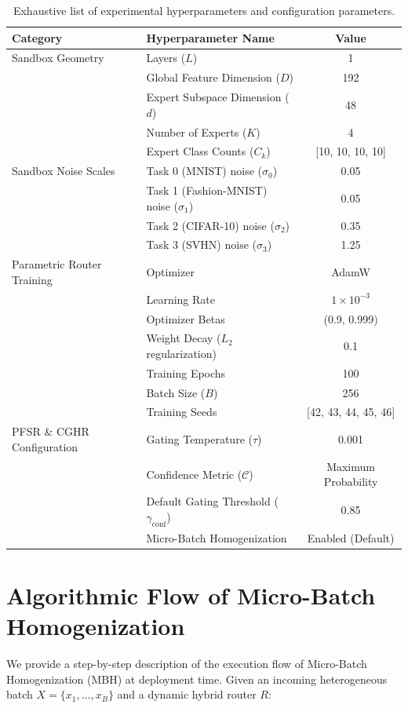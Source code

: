 \documentclass{article}
\theoremstyle{plain}
\theoremstyle{definition}
\theoremstyle{remark}
\begin{document}
\begin{table}[htbp]
\centering
\caption{Exhaustive list of experimental hyperparameters and configuration parameters.}
\label{tab:hyperparams}
\vskip 0.15in
\begin{tabular}{llc}
\toprule
Category & Hyperparameter Name & Value \\
\midrule
Sandbox Geometry & Layers ($L$) & 1 \\
& Global Feature Dimension ($D$) & 192 \\
& Expert Subspace Dimension ($d$) & 48 \\
& Number of Experts ($K$) & 4 \\
& Expert Class Counts ($C_k$) & [10, 10, 10, 10] \\
\midrule
Sandbox Noise Scales & Task 0 (MNIST) noise ($\sigma_0$) & 0.05 \\
& Task 1 (Fashion-MNIST) noise ($\sigma_1$) & 0.05 \\
& Task 2 (CIFAR-10) noise ($\sigma_2$) & 0.35 \\
& Task 3 (SVHN) noise ($\sigma_3$) & 1.25 \\
\midrule
Parametric Router Training & Optimizer & AdamW \\
& Learning Rate & $1 \times 10^{-3}$ \\
& Optimizer Betas & (0.9, 0.999) \\
& Weight Decay ($L_2$ regularization) & 0.1 \\
& Training Epochs & 100 \\
& Batch Size ($B$) & 256 \\
& Training Seeds & [42, 43, 44, 45, 46] \\
\midrule
PFSR \& CGHR Configuration & Gating Temperature ($\tau$) & 0.001 \\
& Confidence Metric ($\mathcal{C}$) & Maximum Probability \\
& Default Gating Threshold ($\gamma_{\text{conf}}$) & 0.85 \\
& Micro-Batch Homogenization & Enabled (Default) \\
\bottomrule
\end{tabular}
\end{table}

\section{Algorithmic Flow of Micro-Batch Homogenization}
\label{app:mbh_alg}

We provide a step-by-step description of the execution flow of Micro-Batch Homogenization (MBH) at deployment time. Given an incoming heterogeneous batch $X = \{x_1, \dots, x_B\}$ and a dynamic hybrid router $R$:
\end{document}
